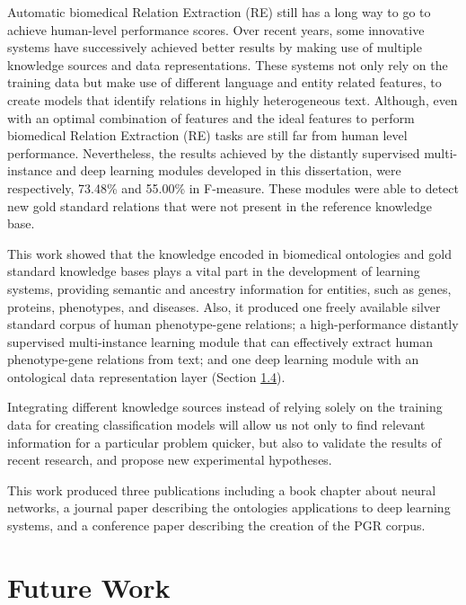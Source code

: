 Automatic biomedical Relation Extraction (RE) still has a long way to go to achieve human-level performance scores. Over recent years, some innovative systems have successively achieved better results by making use of multiple knowledge sources and data representations. These systems not only rely on the training data but make use of different language and entity related features, to create models that identify relations in highly heterogeneous text. Although, even with an optimal combination of features and the ideal features to perform biomedical Relation Extraction (RE) tasks are still far from human level performance. Nevertheless, the results achieved by the distantly supervised multi-instance and deep learning modules developed in this dissertation, were respectively, 73.48\% and 55.00\% in F-measure. These modules were able to detect new gold standard relations that were not present in the reference knowledge base. 

This work showed that the knowledge encoded in biomedical ontologies and gold standard knowledge bases plays a vital part in the development of learning systems, providing semantic and ancestry information for entities, such as genes, proteins, phenotypes, and diseases. Also, it produced one freely available silver standard corpus of human phenotype-gene relations; a high-performance distantly supervised multi-instance learning module that can effectively extract human phenotype-gene relations from text; and one deep learning module with an ontological data representation layer (Section \hyperlink{1.4}{1.4}).

Integrating different knowledge sources instead of relying solely on the training data for creating classification models will allow us not only to find relevant information for a particular problem quicker, but also to validate the results of recent research, and propose new experimental hypotheses. 

This work produced three publications including a book chapter about neural networks, a journal paper describing the ontologies applications to deep learning systems, and a conference paper describing the creation of the PGR corpus.



\section{Future Work}

